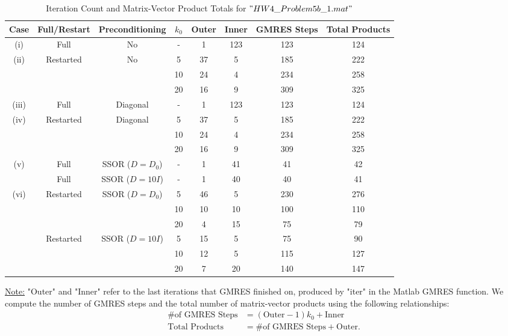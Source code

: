 \documentclass[12pt]{article}
\begin{document}
\begin{table}[H]
\renewcommand{\arraystretch}{1.3}
\hspace{-.35in}
\begin{small}
\begin{tabular}{| c || c | c | c | c | c || c | c |}
\hline
\textbf{Case} &  \textbf{Full/Restart} & \textbf{Preconditioning} & \textbf{$k_0$} & \textbf{Outer} & \textbf{Inner} & \textbf{GMRES Steps} & \textbf{Total Products}\\
\hline 
\hline
(i)  & Full & No & - & 1 & 123 & 123 & 124  \\
\hline
(ii) & Restarted & No & 5 & 37 & 5 & 185 &  222\\
  &  &  & 10 & 24 & 4 & 234 &  258\\
  &  &  & 20 & 16 & 9 & 309 &  325\\
\hline
(iii) & Full & Diagonal & - & 1 & 123 & 123 & 124 \\
\hline
(iv) & Restarted & Diagonal & 5 & 37 & 5 & 185 &  222\\
  &  &  & 10 & 24 & 4 & 234 &  258\\
  &  &  & 20 & 16 & 9 & 309 &  325\\
\hline
(v) & Full & SSOR ($D=D_0$) & - & 1 & 41 & 41 & 42 \\
\hline
 & Full & SSOR ($D=10I$) & - & 1 & 40 & 40 & 41 \\
\hline
(vi) & Restarted & SSOR ($D=D_0$) & 5 & 46 & 5 & 230 &  276\\
  &  &  & 10 & 10 & 10 & 100 &  110\\
  &  &  & 20 & 4 & 15 & 75 & 79\\
\hline
 & Restarted & SSOR ($D=10I$) & 5 & 15 & 5 & 75 &  90\\
  &  &  & 10 & 12 & 5 & 115 &  127\\
  &  &  & 20 & 7 & 20 & 140 &  147\\
\hline
\end{tabular}
\end{small}
\caption{Iteration Count and Matrix-Vector Product Totals for $"HW4\_Problem5b\_1.mat"$}
\end{table}
\noindent
\underline{Note:} "Outer" and "Inner" refer to the last iterations that GMRES finished on, produced by "iter" in the Matlab GMRES function.  We compute the number of GMRES steps and the total number of matrix-vector products using the following relationships:
\begin{align*}
\text{\# of GMRES Steps} &= (\text{Outer}-1)k_0 + \text{Inner} \\
\text{Total Products} &= \text{\# of GMRES Steps} + \text{Outer}. \\
\end{align*}
\\
\end{document}
